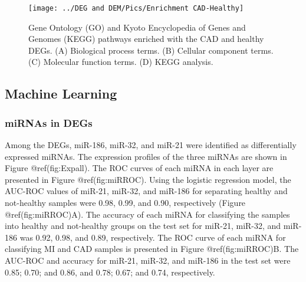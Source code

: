 \documentclass[
]{article}
\begin{document}
\begin{figure}
\texttt{[image: ../DEG and DEM/Pics/Enrichment CAD-Healthy]} \caption{Gene Ontology (GO) and Kyoto Encyclopedia of Genes and Genomes (KEGG) pathways enriched with the CAD and healthy DEGs. (A) Biological process terms. (B) Cellular component terms. (C) Molecular function terms. (D) KEGG analysis.}\label{fig:CADHEnrich}
\end{figure}

\hypertarget{machine-learning}{%
\subsection{Machine Learning}\label{machine-learning}}

\hypertarget{mirnas-in-degs-1}{%
\subsubsection{miRNAs in DEGs}\label{mirnas-in-degs-1}}

Among the DEGs, miR-186, miR-32, and miR-21 were identified as
differentially expressed miRNAs. The expression profiles of the three
miRNAs are shown in Figure @ref(fig:Expall). The ROC curves of each
miRNA in each layer are presented in Figure @ref(fig:miRROC). Using the
logistic regression model, the AUC-ROC values of miR-21, miR-32, and
miR-186 for separating healthy and not-healthy samples were 0.98, 0.99,
and 0.90, respectively (Figure @ref(fig:miRROC)A). The accuracy of each
miRNA for classifying the samples into healthy and not-healthy groups on
the test set for miR-21, miR-32, and miR-186 was 0.92, 0.98, and 0.89,
respectively. The ROC curve of each miRNA for classifying MI and CAD
samples is presented in Figure @ref(fig:miRROC)B. The AUC-ROC and
accuracy for miR-21, miR-32, and miR-186 in the test set were 0.85;
0.70; and 0.86, and 0.78; 0.67; and 0.74, respectively.
\end{document}
